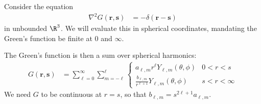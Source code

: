 \documentclass[10pt]{mypackage}
\begin{document}
  \begin{example}
    Consider the equation
    \begin{align*}
      \nabla^2G\left( \mathbf{r},\mathbf{s} \right) &= -\delta\left( \mathbf{r}-\mathbf{s} \right)
    \end{align*}
    in unbounded $\R^3$. We will evaluate this in spherical coordinates, mandating the Green's function be finite at $0$ and $\infty$.\newline

    The Green's function is then a sum over spherical harmonics:
    \begin{align*}
      G\left( \mathbf{r},\mathbf{s} \right) &= \sum_{\ell=0}^{\infty}\sum_{m=-\ell}^{\ell} \begin{cases}
        a_{\ell,m}r^{\ell}Y_{\ell,m}\left( \theta,\phi \right) & 0 < r < s\\
        \frac{b_{\ell,m}}{r^{\ell + 1}}Y_{\ell,m}\left( \theta,\phi \right) & s < r < \infty
      \end{cases}
    \end{align*}
    We need $G$ to be continuous at $r = s$, so that $b_{\ell,m} = s^{2\ell + 1}a_{\ell,m}$.\newline


\end{example}
\end{document}
